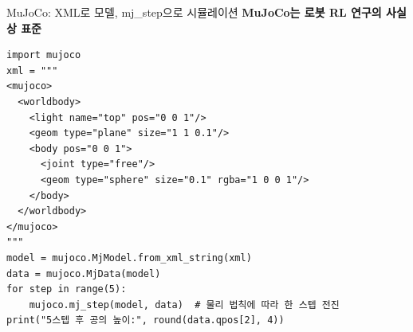 \begin{frame}[fragile]{MuJoCo: XML로 모델, mj\_step으로 시뮬레이션}
  \textbf{MuJoCo는 로봇 RL 연구의 사실상 표준}
\begin{lstlisting}
import mujoco
xml = """
<mujoco>
  <worldbody>
    <light name="top" pos="0 0 1"/>
    <geom type="plane" size="1 1 0.1"/>
    <body pos="0 0 1">
      <joint type="free"/>
      <geom type="sphere" size="0.1" rgba="1 0 0 1"/>
    </body>
  </worldbody>
</mujoco>
"""
model = mujoco.MjModel.from_xml_string(xml)
data = mujoco.MjData(model)
for step in range(5):
    mujoco.mj_step(model, data)  # 물리 법칙에 따라 한 스텝 전진
print("5스텝 후 공의 높이:", round(data.qpos[2], 4))
\end{lstlisting}

\end{frame}
